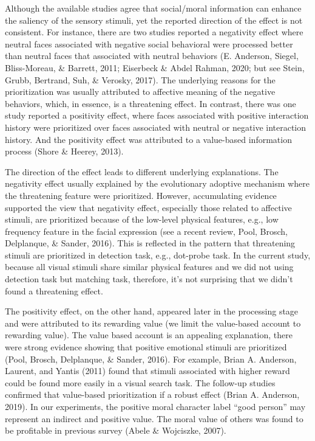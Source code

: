 \documentclass[
  english,
  man]{apa6}
\begin{document}
Although the available studies agree that social/moral information can enhance the saliency of the sensory stimuli, yet the reported direction of the effect is not consistent. For instance, there are two studies reported a negativity effect where neutral faces associated with negative social behavioral were processed better than neutral faces that associated with neutral behaviors (E. Anderson, Siegel, Bliss-Moreau, \& Barrett, 2011; Eiserbeck \& Abdel Rahman, 2020; but see Stein, Grubb, Bertrand, Suh, \& Verosky, 2017). The underlying reasons for the prioritization was usually attributed to affective meaning of the negative behaviors, which, in essence, is a threatening effect. In contrast, there was one study reported a positivity effect, where faces associated with positive interaction history were prioritized over faces associated with neutral or negative interaction history. And the positivity effect was attributed to a value-based information process (Shore \& Heerey, 2013).

The direction of the effect leads to different underlying explanations. The negativity effect usually explained by the evolutionary adoptive mechanism where the threatening feature were prioritized. However, accumulating evidence supported the view that negativity effect, especially those related to affective stimuli, are prioritized because of the low-level physical features, e.g., low frequency feature in the facial expression (see a recent review, Pool, Brosch, Delplanque, \& Sander, 2016). This is reflected in the pattern that threatening stimuli are prioritized in detection task, e.g., dot-probe task. In the current study, because all visual stimuli share similar physical features and we did not using detection task but matching task, therefore, it's not surprising that we didn't found a threatening effect.

The positivity effect, on the other hand, appeared later in the processing stage and were attributed to its rewarding value (we limit the value-based account to rewarding value). The value based account is an appealing explanation, there were strong evidence showing that positive emotional stimuli are prioritized (Pool, Brosch, Delplanque, \& Sander, 2016). For example, Brian A. Anderson, Laurent, and Yantis (2011) found that stimuli associated with higher reward could be found more easily in a visual search task. The follow-up studies confirmed that value-based prioritization if a robust effect (Brian A. Anderson, 2019). In our experiments, the positive moral character label ``good person'' may represent an indirect and positive value. The moral value of others was found to be profitable in previous survey (Abele \& Wojciszke, 2007).
\end{document}
